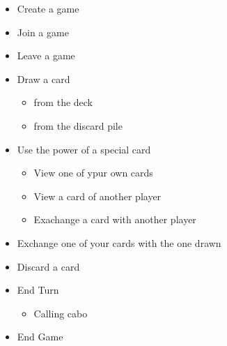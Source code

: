 \documentclass{scrartcl}
\begin{document}
\begin{itemize}
    \item Create a game

    \item Join a game

    \item Leave a game

    \item Draw a card
        \begin{itemize}
            \item from the deck
            \item from the discard pile
        \end{itemize}

    \item Use the power of a special card
        \begin{itemize}
          \item View one of ypur own cards
          \item View a card of another player
          \item Exachange a card with another player 
        \end{itemize}

    \item Exchange one of your cards with the one drawn

    \item Discard a card

    \item End Turn
        \begin{itemize}
            \item Calling cabo
        \end{itemize}
      
    \item End Game
    
\end{itemize}
\end{document}

